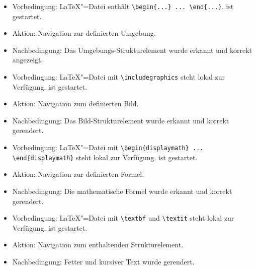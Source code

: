 \begin{itemize}
  \item Vorbedingung: \LaTeX"=Datei enthält \verb|\begin{...} ... \end{...}|.
  \texla{} ist gestartet.
  \item Aktion: Navigation zur definierten Umgebung.
  \item Nachbedingung: Das Umgebungs-Strukturelement wurde erkannt und korrekt angezeigt.
\end{itemize}

\begin{itemize}
  \item Vorbedingung: \LaTeX"=Datei mit \verb|\includegraphics| steht lokal zur Verfügung.
  \texla{} ist gestartet.
  \item Aktion: Navigation zum definierten Bild.
  \item Nachbedingung: Das Bild-Strukturelement wurde erkannt und korrekt gerendert.
\end{itemize}

\begin{itemize}
  \item Vorbedingung: \LaTeX"=Datei mit \verb|\begin{displaymath} ... \end{displaymath}| steht lokal zur Verfügung.
  \texla{} ist gestartet.
  \item Aktion: Navigation zur definierten Formel.
  \item Nachbedingung: Die mathematische Formel wurde erkannt und korrekt gerendert.
\end{itemize}

\clearpage

\begin{itemize}
  \item Vorbedingung: \LaTeX"=Datei mit \verb|\textbf| und \verb|\textit| steht lokal zur Verfügung.
  \texla{} ist gestartet.
  \item Aktion: Navigation zum enthaltenden Strukturelement.
  \item Nachbedingung: Fetter und kursiver Text wurde gerendert.
\end{itemize}

